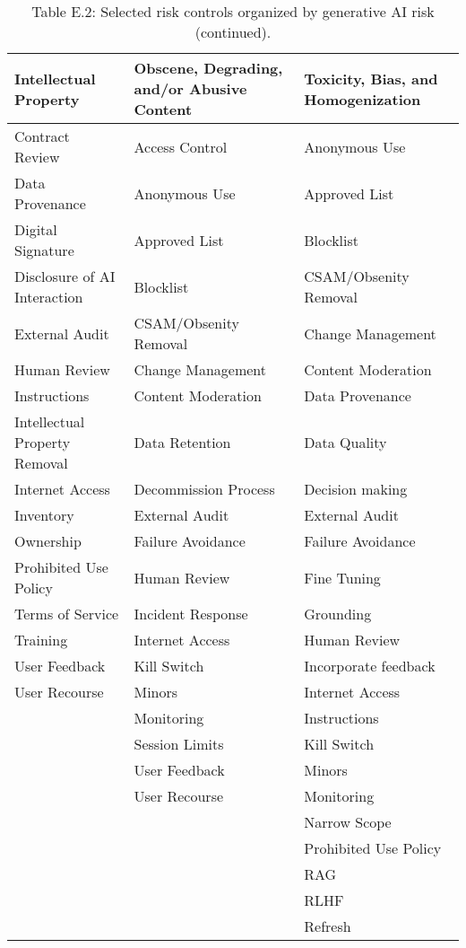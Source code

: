 \documentclass[fleqn]{article}
\begin{document}
\begin{table}[H]
	\caption*{Table E.2: Selected risk controls organized by generative AI risk (continued).}
	\label{tab:controls_by_gai_risk_cont2}
	\footnotesize
	\begin{tabular}{lll}
		\toprule
		\textbf{Intellectual Property} & \textbf{Obscene, Degrading, and/or Abusive Content} & \textbf{Toxicity, Bias, and Homogenization} \\
		\midrule
		Contract Review & Access Control  & Anonymous Use \\
		Data Provenance & Anonymous Use & Approved List \\
		Digital Signature & Approved List & Blocklist  \\
		Disclosure of AI Interaction & Blocklist  & CSAM/Obsenity Removal  \\
		External Audit & CSAM/Obsenity Removal  & Change Management \\
		Human Review  & Change Management & Content Moderation \\
		Instructions & Content Moderation & Data Provenance \\
		Intellectual Property Removal & Data Retention & Data Quality \\
		Internet Access & Decommission Process & Decision making  \\
		Inventory & External Audit & External Audit \\
		Ownership & Failure Avoidance & Failure Avoidance \\
		Prohibited Use Policy & Human Review  & Fine Tuning \\
		Terms of Service & Incident Response & Grounding \\
		Training  & Internet Access & Human Review  \\
		User Feedback & Kill Switch & Incorporate feedback  \\
		User Recourse & Minors & Internet Access \\
		& Monitoring & Instructions \\
		& Session Limits & Kill Switch \\
		& User Feedback & Minors \\
		& User Recourse & Monitoring \\
		&  & Narrow Scope \\
		&  & Prohibited Use Policy \\
		&  & RAG \\
		&  & RLHF \\
		&  & Refresh \\

\end{tabular}
\end{table}
\end{document}
